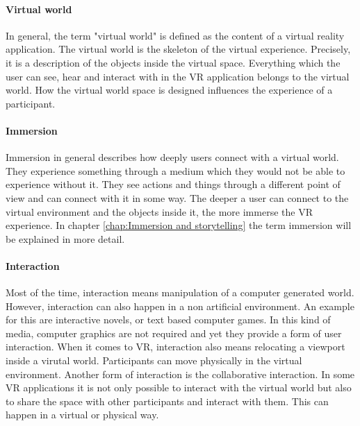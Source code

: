 \paragraph{Virtual world} In general, the term "virtual world" is defined as the content of a virtual reality application.  The virtual world is the skeleton of the virtual experience. Precisely, it is a description of the objects inside the virtual space. Everything which the user can see, hear and interact with in the VR application belongs to the virtual world. How the virtual world space is designed influences the experience of a participant.

\paragraph{Immersion} Immersion in general describes how deeply users connect with a virtual world. They experience something through a medium which they would not be able to experience without it. They see actions and things through a different point of view and can connect with it in some way. The deeper a user can connect to the virtual environment and the objects inside it, the more immerse the VR experience. In chapter \ref{chap:Immersion and storytelling} the term immersion will be explained in more detail.

\paragraph{Interaction} Most of the time, interaction means manipulation of a computer generated world. However, interaction can also happen in a non artificial environment. An example for this are interactive novels, or text based computer games. In this kind of media, computer graphics are not required and yet they provide a form of user interaction. When it comes to VR, interaction also means relocating a viewport inside a virutal world. Participants can move physically in the virtual environment. Another form of interaction is the collaborative interaction. In some VR applications it is not only possible to interact with the virtual world but also to share the space with other participants and interact with them. This can happen in a virtual or physical way.
